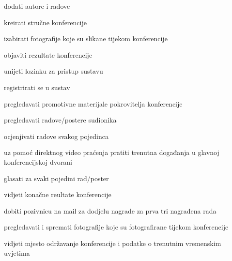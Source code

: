 			
			\begin{packed_enum}
				\item  {}
				
				\begin{packed_enum}
					
					\item dodati autore i radove
					\item kreirati stručne konferencije
					\item izabirati fotografije koje su slikane tijekom konferencije
					\item objaviti rezultate konferencije
					
				\end{packed_enum}
			
				\item  {}
				
				\begin{packed_enum}
					
					\item unijeti lozinku za pristup sustavu
					\item registrirati se u sustav
					
				\end{packed_enum}
				
				
				\item  {}
				
				\begin{packed_enum}
					
					\item pregledavati promotivne materijale pokrovitelja konferencije
					\item pregledavati radove/postere sudionika
					\item ocjenjivati radove svakog pojedinca
					\item uz pomoć direktnog video praćenja pratiti trenutna događanja u glavnoj konferencijskoj dvorani
					\item glasati za svaki pojedini rad/poster
					\item vidjeti konačne reultate konferencije
					\item dobiti pozivnicu na mail za dodjelu nagrade za prva tri nagrađena rada
					\item pregledavati i spremati fotografije koje su fotografirane tijekom konferencije
					\item vidjeti mjesto održavanje konferencije i podatke o trenutnim vremenskim uvjetima
					

\end{packed_enum}
\end{packed_enum}
